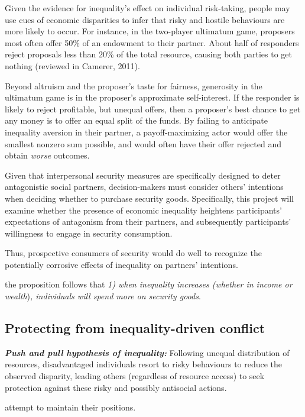 \documentclass[
  english,
  man]{apa6}
\begin{document}
Given the evidence for inequality's effect on individual risk-taking, people may use cues of economic disparities to infer that risky and hostile behaviours are more likely to occur. For instance, in the two-player ultimatum game, proposers most often offer 50\% of an endowment to their partner. About half of responders reject proposals less than 20\% of the total resource, causing both parties to get nothing (reviewed in Camerer, 2011).

Beyond altruism and the proposer's taste for fairness, generosity in the ultimatum game is in the proposer's approximate self-interest. If the responder is likely to reject profitable, but unequal offers, then a proposer's best chance to get any money is to offer an equal split of the funds. By failing to anticipate inequality aversion in their partner, a payoff-maximizing actor would offer the smallest nonzero sum possible, and would often have their offer rejected and obtain \emph{worse} outcomes.

Given that interpersonal security measures are specifically designed to deter antagonistic social partners, decision-makers must consider others' intentions when deciding whether to purchase security goods. Specifically, this project will examine whether the presence of economic inequality heightens participants' expectations of antagonism from their partners, and subsequently participants' willingness to engage in security consumption.

Thus, prospective consumers of security would do well to recognize the potentially corrosive effects of inequality on partners' intentions.

the proposition follows that \emph{1) when inequality increases (whether in income or wealth})\emph{, individuals will spend more on security goods}.

\hypertarget{protecting-from-inequality-driven-conflict}{%
\subsection{Protecting from inequality-driven conflict}\label{protecting-from-inequality-driven-conflict}}

\textbf{\emph{Push and pull hypothesis of inequality:}} Following unequal distribution of resources, disadvantaged individuals resort to risky behaviours to reduce the observed disparity, leading others (regardless of resource access) to seek protection against these risky and possibly antisocial actions.

attempt to maintain their positions.
\end{document}
